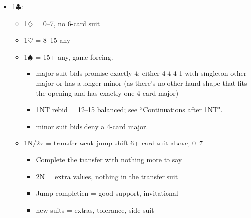 \documentclass[a4paper,12pt]{article}
\begin{document}
\begin{itemize}
\item 1$\clubsuit$:
	\begin{itemize}
   \item 1$\diamondsuit$ = 0--7, no 6-card suit
   \item 1$\heartsuit$ = 8--15 any
   \item 1$\spadesuit$ = 15+ any, game-forcing.
		\begin{itemize}
      \item major suit bids promise exactly 4; either 4-4-4-1 with singleton other
         major or has a longer minor (as there's no other hand shape that fits the
         opening and has exactly one 4-card major)
      \item 1NT rebid = 12--15 balanced; see ``Continuations after 1NT".
      \item minor suit bids deny a 4-card major.
		\end{itemize}
   \item 1N/2x = transfer weak jump shift 6+ card suit above, 0--7.
		\begin{itemize}
		\item Complete the transfer with nothing more to say
		\item 2N = extra values, nothing in the transfer suit
		\item Jump-completion = good support, invitational
		\item new suits = extras, tolerance, side suit
		\end{itemize}
	\end{itemize}


\end{itemize}
\end{document}
